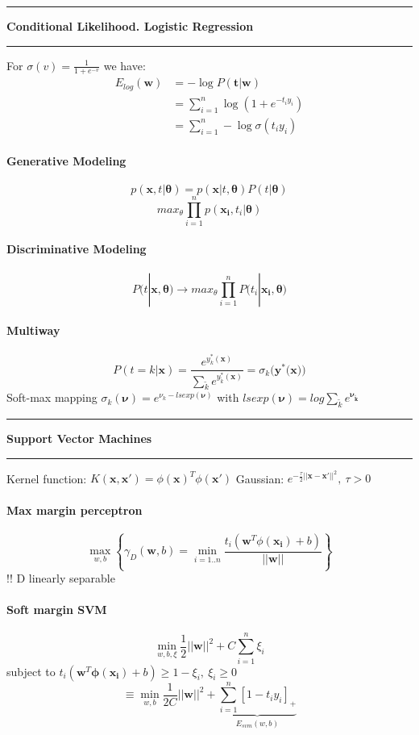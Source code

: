 \documentclass[7pt]{scrartcl}
\newlength{\secskip}
\renewcommand{\section}[1]{
  \vspace{\secskip}
  \hrule\vspace{.4em}
  \textbf{#1}
  \vspace{.4em}
  \hrule
  \vspace{\secskip}
}
\renewcommand{\vec}{\mathbf}
\begin{document}
\begin{multicols}{4}
\section{Conditional Likelihood. Logistic Regression}
For $\sigma(v) = \frac{1}{1+e^{-v}}$ we have:
\begin{align*}
 E_{log}(\vec w) &= - \log P(\vec t | \vec w)\\
 &= \sum\nolimits_{i=1}^n \log \left (1 + e^{-t_iy_i} \right)\\
 &= \sum\nolimits_{i=1}^n -\log \sigma (t_iy_i)
\end{align*}
\paragraph{Generative Modeling}
\[p(\vec{x},t|\vec{\theta}) = p(\vec{x}|t,\vec{\theta})P(t|\vec{\theta}) \]
\[max_{\theta} \prod_{i=1}^n p(\vec{x_i},t_i|\vec{\theta})\]
\paragraph{Discriminative Modeling}
\[P(t|\vec{x,\theta}) \rightarrow max_\theta \prod_{i=1}^n P(t_i|\vec{x_i,\theta)}\]
\paragraph{Multiway}
\[P(t=k|\vec{x}) = \frac{e^{y_k^*(\vec{x})}}{\sum_{\tilde{k}}e^{y_{\tilde{k}}^*(\vec{x})}} = \sigma_k(\vec{y}^*(\vec{x))}\]
Soft-max mapping $\sigma_k(\vec{\nu}) = e^{\nu_k - lsexp(\vec{\nu})}$ with $lsexp(\vec{\nu}) = log \sum_{\tilde{k}}e^{\vec{\nu_{\tilde{k}}}}$

\section{Support Vector Machines}
Kernel function: $K(\vec x, \vec x') = \phi(\vec x)^T\phi(\vec x')$
Gaussian: $e^{-\frac{\tau}{2}||\vec{x}-\vec{x'}||^2}, ~ \tau >0$
\paragraph{Max margin perceptron}
\[\max_{w,b} \left\{ \gamma_D(\vec{w},b) = \min_{i=1..n} \frac{t_i(\vec{w}^T \phi(\vec{x_i}) + b)}{||\vec{w}||} \right\}\]
!! D linearly separable
\paragraph{Soft margin SVM}
\[\min_{w,b,\xi} \frac{1}{2}||\vec{w}||^2 + C \sum_{i=1}^n \xi_i\]
subject to $t_i(\vec{w}^T \vec{\phi(x_i)} + b) \geq 1-\xi_i,~ \xi_i \geq 0$
\[\equiv \min_{w,b} \frac{1}{2C}||\vec{w}||^2 + \underbrace{\sum_{i=1}^n [1-t_iy_i]_+}_{E_{svm}(w,b)}\]

\end{multicols}
\end{document}
